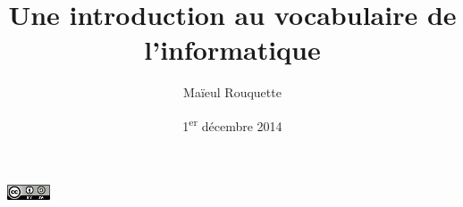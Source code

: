 \documentclass{beamer}
\author{Maïeul Rouquette}
\date{1\textsuperscript{er} décembre 2014}
\title{Une introduction au vocabulaire de l'informatique}
\begin{document}
\begin{slide}
\titlepage

\vfill
\hfill\includegraphics[width=36pt]{cc-by-sa.png}
 \hfill\hbox{}
\end{slide}
\end{document}
